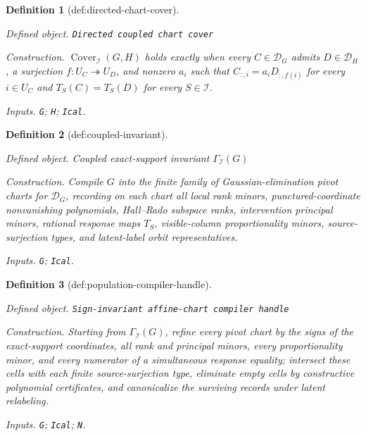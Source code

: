\documentclass{article}
\newtheorem{definition}{Definition}
\begin{document}
\begin{definition}[def:directed-chart-cover]\label{def:directed-chart-cover}
\par\smallskip\noindent\emph{Defined object.} \texttt{Directed coupled chart cover}
\par\smallskip\noindent\emph{Construction.} \(\operatorname{Cover}_{\mathcal I}(G,H)\) holds exactly when every \(C\in\mathcal D_G\) admits \(D\in\mathcal D_H\), a surjection \(f:U_C\twoheadrightarrow U_D\), and nonzero \(a_i\) such that \(C_{:,i}=a_iD_{:,f(i)}\) for every \(i\in U_C\) and \(T_S(C)=T_S(D)\) for every \(S\in\mathcal I\).
\par\smallskip\noindent\emph{Inputs.} \texttt{G}; \texttt{H}; \texttt{Ical}.
\end{definition}

\begin{definition}[def:coupled-invariant]\label{def:coupled-invariant}
\par\smallskip\noindent\emph{Defined object.} Coupled exact-support invariant \(\Gamma_{\mathcal I}(G)\)
\par\smallskip\noindent\emph{Construction.} Compile \(G\) into the finite family of Gaussian-elimination pivot charts for \(\mathcal D_G\), recording on each chart all local rank minors, punctured-coordinate nonvanishing polynomials, Hall--Rado subspace ranks, intervention principal minors, rational response maps \(T_S\), visible-column proportionality minors, source-surjection types, and latent-label orbit representatives.
\par\smallskip\noindent\emph{Inputs.} \texttt{G}; \texttt{Ical}.
\end{definition}

\begin{definition}[def:population-compiler-handle]\label{def:population-compiler-handle}
\par\smallskip\noindent\emph{Defined object.} \texttt{Sign-\allowbreak{}invariant affine-\allowbreak{}chart compiler handle}
\par\smallskip\noindent\emph{Construction.} Starting from \(\Gamma_{\mathcal I}(G)\), refine every pivot chart by the signs of the exact-support coordinates, all rank and principal minors, every proportionality minor, and every numerator of a simultaneous response equality; intersect these cells with each finite source-surjection type, eliminate empty cells by constructive polynomial certificates, and canonicalize the surviving records under latent relabeling.
\par\smallskip\noindent\emph{Inputs.} \texttt{G}; \texttt{Ical}; \texttt{N}.
\end{definition}
\end{document}
